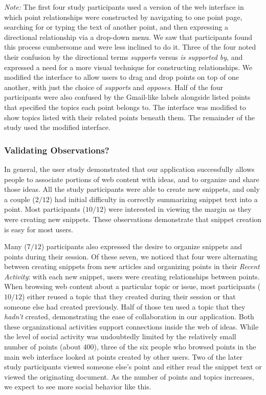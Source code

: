 \documentclass{chi2009}
\begin{document}
{\it Note:} The first four study participants used a version of the web interface in which point relationships were constructed by navigating to one point page, searching for or typing the text of another point, and then expressing a directional relationship via a drop-down menu. We saw that participants found this process cumbersome and were less inclined to do it. Three of the four noted their confusion by the directional terms {\it supports} versus {\it is supported by}, and expressed a need for a more visual technique for constructing relationships. We modified the interface to allow users to drag and drop points on top of one another, with just the choice of {\it supports} and {\it opposes}. Half of the four participants were also confused by the Gmail-like labels alongside listed points that specified the topics each point belongs to.  The interface was modified to show topics listed with their related points beneath them. The remainder of the study used the modified interface. 


\subsubsection{Validating Observations?}
In general, the user study demonstrated that our application successfully allows people to associate portions of web content with ideas, and to organize and share those ideas. All the study participants were able to create new snippets, and only a couple ($2/12$) had initial difficulty in correctly summarizing snippet text into a point. Most participants ($10/12$) were interested in viewing the margin as they were creating new snippets. These observations demonstrate that snippet creation is easy for most users.

Many ($7/12$) participants also expressed the desire to organize snippets and points during their session. Of these seven, we noticed that four were alternating between creating snippets from new articles and organizing points in their {\it Recent Activity}: with each new snippet, users were creating relationships between points. When browsing web content about a particular topic or issue, most participants ($10/12$) either reused a topic that they created during their session or that someone else had created previously. Half of those ten used a topic that they {\it hadn't} created, demonstrating the ease of collaboration in our application. Both these organizational activities support connections inside the web of ideas. While the level of social activity was undoubtedly limited by the relatively small number of points (about $400$), three of the six people who browsed points in the main web interface looked at points created by other users. Two of the later study participants viewed someone else's point and either read the snippet text or viewed the originating document. As the number of points and topics increases, we expect to see more social behavior like this.
\end{document}
